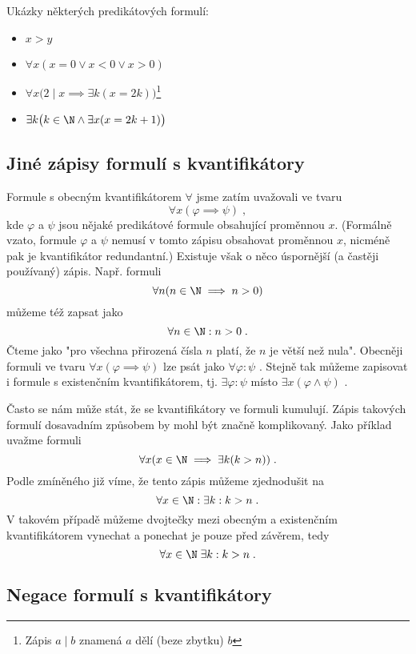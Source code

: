 \begin{example}
    Ukázky některých predikátových formulí:
    \begin{itemize}
        \item $x>y$
        \item $\forall x (x = 0 \lor x < 0 \lor x > 0)$
        \item $\forall x \big(2 \mid x \implies \exists k (x=2k)\big)$\footnote{Zápis $a \mid b$ znamená $a$ dělí (beze zbytku) $b$}
        \item $\exists k \big(k \in \N \land \exists x (x=2k+1)\big)$
    \end{itemize}
\end{example}

\subsection{Jiné zápisy formulí s kvantifikátory}
Formule s obecným kvantifikátorem $\forall$ jsme zatím uvažovali ve tvaru
\begin{equation*}
    \forall x(\varphi \implies \psi)\; ,
\end{equation*}
kde $\varphi$ a $\psi$ jsou nějaké predikátové formule obsahující proměnnou $x$. (Formálně vzato, formule $\varphi$ a $\psi$ nemusí v tomto zápisu obsahovat proměnnou $x$, nicméně pak je kvantifikátor redundantní.) Existuje však o něco úspornější (a častěji používaný) zápis. Např. formuli
\begin{equation*}
    \forall n (n \in \N \implies n > 0)
\end{equation*}
můžeme též zapsat jako
\begin{equation*}
    \forall n \in \N : n > 0\; .
\end{equation*}
Čteme jako "pro všechna přirozená čísla $n$ platí, že $n$ je větší než nula". Obecněji formuli ve tvaru $\forall x(\varphi \implies \psi)$ lze psát jako $\forall \varphi : \psi$ . Stejně tak můžeme zapisovat i formule s existenčním kvantifikátorem, tj. $\exists \varphi : \psi$ místo $\exists x (\varphi \land \psi)$ .
\medskip

Často se nám může stát, že se kvantifikátory ve formuli kumulují. Zápis takových formulí dosavadním způsobem by mohl být značně komplikovaný. Jako příklad uvažme formuli
\begin{equation*}
    \forall x (x \in \N \implies \exists k (k > n))\; .
\end{equation*}
Podle zmíněného již víme, že tento zápis můžeme zjednodušit na
\begin{equation*}
    \forall x \in \N : \exists k : k > n\; .
\end{equation*}
V takovém případě můžeme dvojtečky mezi obecným a existenčním kvantifikátorem vynechat a ponechat je pouze před závěrem, tedy
\begin{equation*}
    \forall x \in \N\;\exists k : k > n\; .
\end{equation*}

\subsection{Negace formulí s kvantifikátory}

